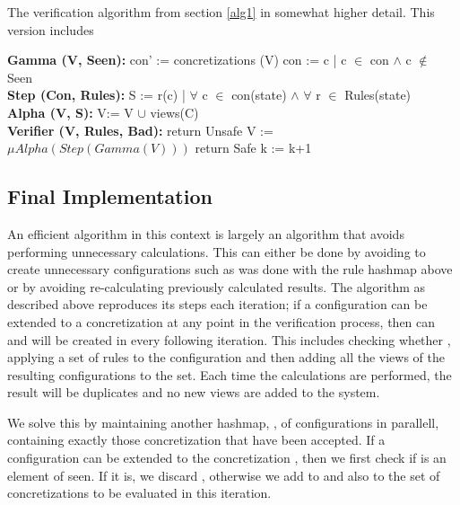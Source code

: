\begin{algorithm}
  \caption{The verification algorithm from section \ref{alg1} in somewhat higher detail. This version includes }\label{euclid}
  \begin{algorithmic}[1]
    \State \textbf{Gamma (V, Seen):}
    \State \hspace{6 mm} con' := concretizations (V)
    \State \hspace{6 mm} con  := c | c $\in$ con $\land$ c $\notin$ Seen
    \\
    \State \textbf{Step (Con, Rules):}
    \State \hspace{6 mm} S := r(c) | $\forall$ c $\in$ con(state) $\land$ $\forall$ r $\in$ Rules(state)
    \EndFor
    \\            
    \State \textbf{Alpha (V, S):}
    \State \hspace{6 mm} V:= V $\cup$ views(C)
    \\
    \State \textbf{Verifier (V, Rules, Bad):}
        \State return Unsafe
        \EndIf
        \State V := $\mu Alpha(Step(Gamma(V)))$
        \State return Safe     
        \EndIf
        \State k := k+1
      \EndFor
\end{algorithmic}
\end{algorithm}


\subsection{Final Implementation}
An efficient algorithm in this context is largely an algorithm that avoids performing unnecessary calculations. This can either be done by avoiding to create unnecessary configurations such as was done with the rule hashmap above or by avoiding re-calculating previously calculated results. The algorithm as described above reproduces its steps each iteration; if a configuration  can be extended to a concretization  at any point in the verification process, then  can and will be created in every following iteration. This includes checking whether , applying a set of rules to the configuration and then adding all the views of the resulting configurations to the set. Each time the calculations are performed, the result will be duplicates and no new views are added to the system.

We solve this by maintaining another hashmap, , of configurations in parallell, containing exactly those concretization that have been accepted. If a configuration  can be extended to the concretization , then we first check if  is an element of seen. If it is, we discard , otherwise we add  to  and also to the set of concretizations to be evaluated in this iteration.


